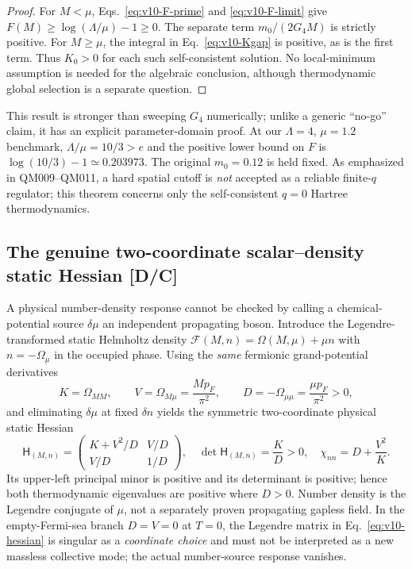 \documentclass[11pt,a4paper]{article}
\begin{document}
\begin{proof}
For $M<\mu$, Eqs.~\eqref{eq:v10-F-prime} and \eqref{eq:v10-F-limit} give $F(M)\ge\log(\Lambda/\mu)-1\ge0$. The separate term $m_0/(2G_4M)$ is strictly positive. For $M\ge\mu$, the integral in Eq.~\eqref{eq:v10-Kgap} is positive, as is the first term. Thus $K_0>0$ for each such self-consistent solution. No local-minimum assumption is needed for the algebraic conclusion, although thermodynamic global selection is a separate question.
\end{proof}
This result is stronger than sweeping $G_4$ numerically; unlike a generic ``no-go'' claim, it has an explicit parameter-domain proof. At our $\Lambda=4$, $\mu=1.2$ benchmark, $\Lambda/\mu=10/3>e$ and the positive lower bound on $F$ is $\log(10/3)-1\simeq0.203973$. The original $m_0=0.12$ is held fixed. As emphasized in QM009--QM011, a hard spatial cutoff is \emph{not} accepted as a reliable finite-$q$ regulator; this theorem concerns only the self-consistent $q=0$ Hartree thermodynamics.

\subsection{The genuine two-coordinate scalar--density static Hessian [D/C]}\label{sec:v10-legendre}
A physical number-density response cannot be checked by calling a chemical-potential source $\delta\mu$ an independent propagating boson. Introduce the Legendre-transformed static Helmholtz density $\mathcal F(M,n)=\Omega(M,\mu)+\mu n$ with $n=-\Omega_\mu$ in the occupied phase. Using the \emph{same} fermionic grand-potential derivatives
\begin{equation}\label{eq:v10-thermo-derivs}
K=\Omega_{MM},\qquad V=\Omega_{M\mu}=\frac{Mp_F}{\pi^2},\qquad
D=-\Omega_{\mu\mu}=\frac{\mu p_F}{\pi^2}>0,
\end{equation}
and eliminating $\delta\mu$ at fixed $\delta n$ yields the symmetric two-coordinate physical static Hessian
\begin{equation}\label{eq:v10-hessian}
\boxed{\mathsf H_{(M,n)}=
\begin{pmatrix}K+V^2/D&V/D\\ V/D&1/D\end{pmatrix},\quad
\det\mathsf H_{(M,n)}=\frac KD>0,\quad
\chi_{nn}=D+\frac{V^2}{K}.}
\end{equation}
Its upper-left principal minor is positive and its determinant is positive; hence both thermodynamic eigenvalues are positive where $D>0$. Number density is the Legendre conjugate of $\mu$, not a separately proven propagating gapless field. In the empty-Fermi-sea branch $D=V=0$ at $T=0$, the Legendre matrix in Eq.~\eqref{eq:v10-hessian} is singular as a \emph{coordinate choice} and must not be interpreted as a new massless collective mode; the actual number-source response vanishes.
\end{document}
